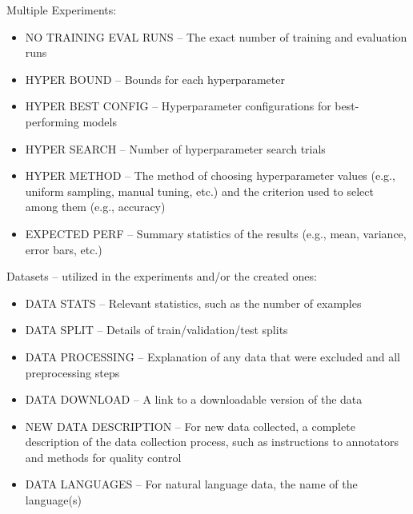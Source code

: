 \documentclass[11pt]{article}
\begin{document}
Multiple Experiments:
\begin{itemize}
    \item NO TRAINING EVAL RUNS -- The exact number of training and evaluation runs
    \item HYPER BOUND -- Bounds for each hyperparameter
    \item HYPER BEST CONFIG -- Hyperparameter configurations for best-performing models
    \item HYPER SEARCH -- Number of hyperparameter search trials
    \item HYPER METHOD -- The method of choosing hyperparameter values (e.g., uniform sampling, manual tuning, etc.) and the criterion used to select among them (e.g., accuracy)
    \item EXPECTED PERF -- Summary statistics of the results (e.g., mean, variance, error bars, etc.)
\end{itemize}

Datasets -- utilized in the experiments and/or the created ones:
\begin{itemize}
    \item DATA STATS -- Relevant statistics, such as the number of examples
    \item DATA SPLIT -- Details of train/validation/test splits
    \item DATA PROCESSING -- Explanation of any data that were excluded and all preprocessing steps
    \item DATA DOWNLOAD -- A link to a downloadable version of the data
    \item NEW DATA DESCRIPTION --  For new data collected, a complete description of the data collection process, such as instructions to annotators and methods for quality control
    \item DATA LANGUAGES -- For natural language data, the name of the language(s)
\end{itemize}
\end{document}
